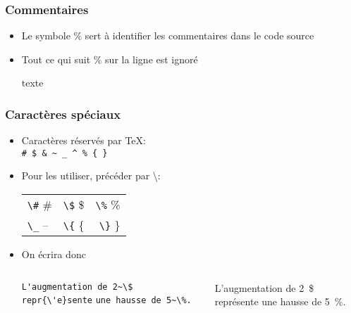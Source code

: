 
\begin{frame}[fragile]
	
	\frametitle{Commentaires}
	
	\begin{itemize}
		\item Le symbole \% sert à identifier les commentaires dans le code	source
		\item Tout ce qui suit \% sur la ligne est ignoré
		
		\begin{codesource}
	texte %
		\end{codesource}
	\end{itemize}
\end{frame}


\begin{frame}[fragile]

	\frametitle{Caractères spéciaux}
	
	\begin{itemize}
		\item Caractères réservés par \TeX  : \\
		\lstinline|# $ & ~ _ ^ % { }|
		
		\item Pour les utiliser, précéder par \textbackslash  :\\
		\begin{tabular}{lcr}
			\lstinline|\#|  \#	&	\lstinline|\$|  \$	&	\lstinline|\%|  \% \\
			\lstinline|\_|  --	&	\lstinline|\{|  \{	&	\lstinline|\}|  \}
		\end{tabular}
	
		\item On écrira donc
		
		\begin{columns}
			
			\lstinline|L'augmentation de 2~\$ repr{\'e}sente|
			\lstinline|une hausse de 5~\%.|
			
			
			L’augmentation de 2~\$ représente une hausse de 5~\%.
		\end{columns}
	\end{itemize}

\end{frame}

